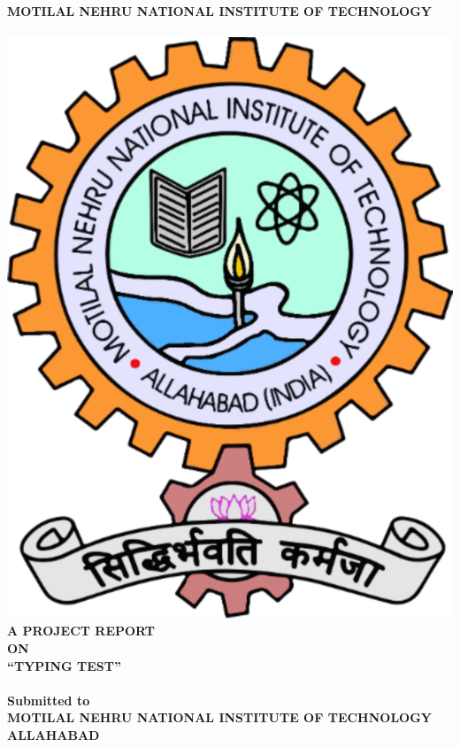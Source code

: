 \newpage
\begin{center}
\thispagestyle{empty}
\LARGE{\textbf{MOTILAL    NEHRU   NATIONAL   INSTITUTE   OF TECHNOLOGY \\ }}\\[0.14cm] 
\vspace{1.0cm}
\includegraphics[scale=0.2]{project/images/MNNIT}\\\vspace{1cm}
\Large{\textbf{A PROJECT REPORT\\ \large{ON}}}\\[0.7cm]
\LARGE{ \textsc {\textbf{``TYPING TEST''}}}\\[0.5cm]
\vspace{0.5cm}
\Large{\textbf{\\Submitted to}}
\LARGE{\textbf{\\MOTILAL NEHRU NATIONAL  INSTITUTE OF TECHNOLOGY ALLAHABAD \\}}

\end{center}
